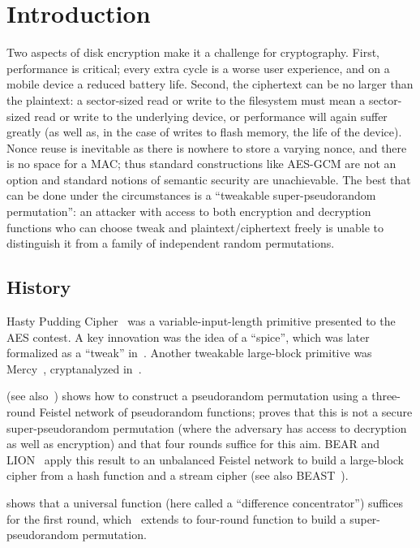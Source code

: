 \documentclass[eprint.tex]{subfiles}
\begin{document}
\section{Introduction}
Two aspects of disk encryption make it a challenge for cryptography.  First,
performance is critical; every extra cycle is a worse user experience, and on a mobile device
a reduced battery life.  Second, the ciphertext can be no larger than the plaintext: a sector-sized
read or write to the filesystem must mean a sector-sized read or write to the underlying device,
or performance will again suffer greatly
(as well as, in the case of writes to flash memory, the life of the device).
Nonce reuse is inevitable as there is nowhere to store a varying nonce, and there is no space
for a MAC; thus standard constructions like AES-GCM are not an option and standard notions
of semantic security are unachievable.  The best that can be done under the circumstances is
a ``tweakable super-pseudorandom permutation'': an attacker with access to both encryption
and decryption functions who can choose tweak and plaintext/ciphertext freely is unable to
distinguish it from a family of independent random permutations.

\subsection{History}

Hasty Pudding Cipher~\cite{hpc} was a variable-input-length primitive presented to the AES contest.
A key innovation
was the idea of a ``spice'', which was later formalized as a ``tweak'' in~\cite{tweakable}.
Another tweakable large-block primitive was Mercy~\cite{mercy},
cryptanalyzed in~\cite{mercycryptanalysis}.

\cite{luby-rackoff} (see also~\cite{maurer-luby-rackoff,ppdes})
shows how to construct a pseudorandom permutation using a three-round Feistel
network of pseudorandom functions;
proves that this is not a secure super-pseudorandom permutation (where the adversary
has access to decryption as well as encryption) and that four rounds suffice for this aim.
BEAR and LION~\cite{bearlion} apply this result to an unbalanced Feistel network to build a
large-block cipher from a hash function and a stream cipher (see also BEAST~\cite{beast}).

\cite{fasterlr} shows that a universal function (here called a ``difference concentrator'')
suffices for the first round, which~\cite{NaorReingold} extends to four-round function
to build a super-pseudorandom permutation.
\end{document}
